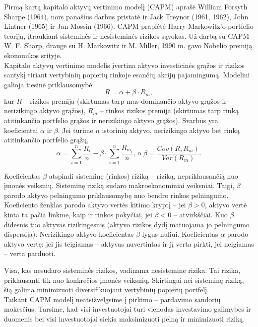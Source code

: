 \documentclass[12pt, a14paper, lithuanian]{article}
\begin{document}
Pirmą kartą kapitalo aktyvų vertinimo modelį (CAPM) aprašė William Forsyth Sharpe (1964), nors panašius darbus pristatė ir Jack Treynor (1961, 1962), John Lintner (1965) ir Jan Mossin (1966). CAPM praplėtė Harry Markowitz'o portfelio teoriją, įtraukiant sisteminės ir nesisteminės rizikos sąvokas. Už darbą su CAPM W. F. Sharp, drauge su H. Markowitz ir M. Miller, 1990 m. gavo Nobelio premiją ekonomikos srityje. \\

Kapitalo aktyvų vertinimo modelis įvertina aktyvo investicinės grąžos ir rizikos santykį tiriant 
vertybinių popierių rinkoje esančių akcijų pajamingumą. Modeliui galioja tiesinė priklausomybė:
$$ R = \alpha  + \beta  \cdot R_m, $$ kur $ R $ -- rizikos premija (skirtumas tarp mus dominančio aktyvo grąžos ir nerizikingo aktyvo grąžos), $ R_m $ -- rinkos rizikos premija (skirtumas tarp rinką atitinkančio portfelio grąžos ir nerizikingo aktyvo grąžos). Svarbūs yra koeficientai $ \alpha $ ir $ \beta $. Jei turime $ n $ istorinių aktyvo, nerizikingo aktyvo bet rinką atitinkančio portfelio grąžų, $$ \alpha = \sum_{i=1}^{n}\frac{R_i}{n} - \beta \cdot \sum_{i=1}^{n}\frac{R_m_i}{n} \text{, o } \beta = \frac{Cov (R, R_m)} { Var (R_m) }. $$ 

 Koeficientas $ \beta $ atspindi sisteminę (rinkos) riziką -- riziką, nepriklausančią nuo įmonės veiksnių. Sisteminę riziką sudaro makroekonominiai veiksniai. Taigi, $ \beta $ parodo aktyvo pelningumo priklausomybę nuo bendro rinkos pelningumo. Koeficiento ženklas parodo aktyvo vertės kitimo kryptį -- jei $ \beta > 0 $, aktyvo vertė kinta ta pačia linkme, kaip ir rinkos pokyčiai, jei $ \beta < 0 $ -- atvirkščiai. Kuo $ \beta $  didesnis tuo aktyvas rizikingesnis (aktyvo rizikos dydį matuojama jo pelningumo dispersija). Nerizikingo aktyvo koeficientas $ \beta $ lygus nuliui. Koeficientas $ \alpha $ parodo aktyvo vertę: jei jis teigiamas -- aktyvas nuvertintas ir jį verta pirkti, jei neigiamas -- verta parduoti.

Visa, kas nesudaro sisteminės rizikos, vadinama nesistemine rizika. Tai rizika, priklausanti tik nuo konkrečios įmonės veiksnių. Skirtingai nei sisteminę riziką, šią galima minimizuoti diversifikuojant vertybinių popierių portfelį.\\

Taikant CAPM modelį neatsižvelgsime į pirkimo -- pardavimo sandorių mokesčius. Tarsime, kad visi investuotojai turi vienodas investavimo galimybes ir duomenis bei visi investuotojai siekia maksimizuoti pelną ir minimizuoti riziką.
\end{document}

